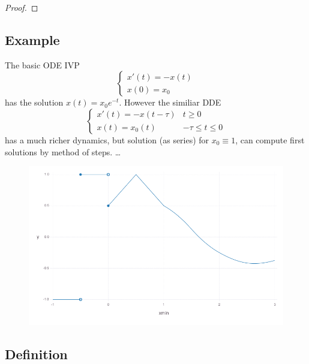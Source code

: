 \begin{proof}

\end{proof}


\subsection{Example}\label{example}
The basic ODE IVP
\begin{equation}
    \begin{cases}
        x'(t) = -x(t)\\
        x(0) = x_0
    \end{cases}
\end{equation}
has the solution $x(t)=x_0 e^{-t}$. However the similiar DDE
\begin{equation}
    \begin{cases}
        x'(t) = -x(t-\tau) & t\geq 0\\
        x(t) = x_0(t) & -\tau\leq t\leq 0
    \end{cases}
\end{equation}
has a much richer dynamics, but solution (as series) for $x_0\equiv 1$, can compute first solutions by method of steps. \ldots{}

\begin{figure}[h]\centering
    \includegraphics[width=\textwidth]{figures/piecewise-initial-function.png}
	\label{fig:not-allowed}
\end{figure}

\subsection{Definition}\label{definition}
